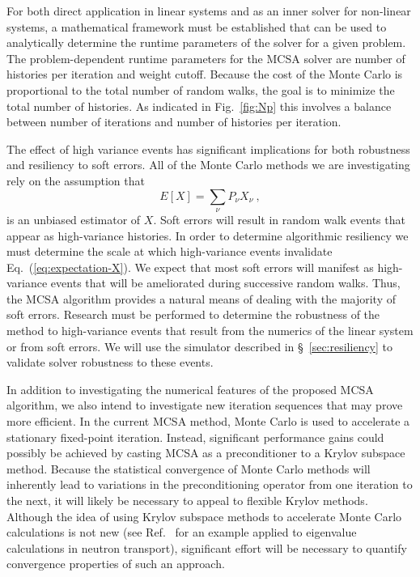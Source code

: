 For both direct application in linear systems and as an inner solver for
non-linear systems, a mathematical framework must be established that can be
used to analytically determine the runtime parameters of the solver for a
given problem.  The problem-dependent runtime parameters for the MCSA solver
are number of histories per iteration and weight cutoff.  Because the cost of
the Monte Carlo is proportional to the total number of random walks, the goal
is to minimize the total number of histories.  As indicated in
Fig.~\ref{fig:Np} this involves a balance between number of iterations and
number of histories per iteration.

The effect of high variance events has significant implications for both
robustness and resiliency to soft errors.  All of the Monte Carlo methods we
are investigating rely on the assumption that
\begin{equation}
    E[X] = \sum_{\nu}P_\nu X_\nu\:,
    \label{eq:expectation-X}
\end{equation}
is an unbiased estimator of $X$. Soft errors will result in random walk events
that appear as high-variance histories.  In order to determine algorithmic
resiliency we must determine the scale at which high-variance events
invalidate Eq.~(\ref{eq:expectation-X}).  We expect that most soft errors will
manifest as high-variance events that will be ameliorated during successive
random walks.  Thus, the MCSA algorithm provides a natural means of dealing
with the majority of soft errors.  Research must be performed to determine the
robustness of the method to high-variance events that result from the numerics
of the linear system or from soft errors.  We will use the simulator described
in \S~\ref{sec:resiliency} to validate solver robustness to these events.

In addition to investigating the numerical features of the proposed MCSA
algorithm, we also intend to investigate new iteration sequences that may
prove more efficient.  In the current MCSA method, Monte Carlo is used to
accelerate a stationary fixed-point iteration.  Instead, significant
performance gains could possibly be achieved by casting MCSA as a 
preconditioner to a Krylov subspace method.  Because the statistical 
convergence of Monte Carlo methods will inherently lead to variations in 
the preconditioning operator from one iteration to the next, it will likely 
be necessary to appeal to flexible Krylov methods\cite{saad93}. Although
the idea of using Krylov subspace methods to accelerate Monte Carlo
calculations is not new (see Ref.~\cite{conlin11} for an example applied
to eigenvalue calculations in neutron transport), significant effort 
will be necessary to quantify convergence properties of such an approach.

